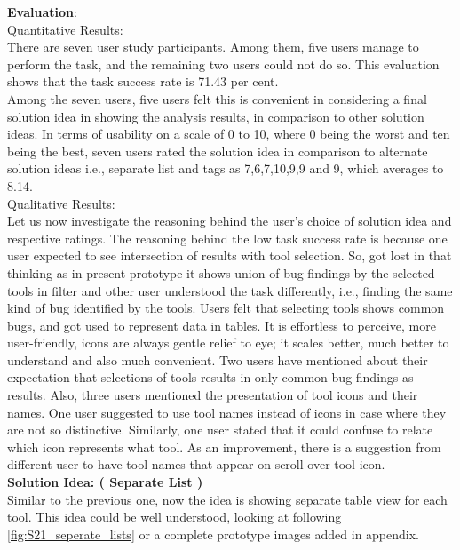 \textbf{Evaluation}: \\

Quantitative Results: \\

There are seven user study participants. Among them, five users manage to perform the task, and the remaining two users could not do so. This evaluation shows that the task success rate is 71.43 per cent. \\

Among the seven users, five users felt this is convenient in considering a final solution idea in showing the analysis results, in comparison to other solution ideas. In terms of usability on a scale of 0 to 10, where 0 being the worst and ten being the best, seven users rated the solution idea in comparison to alternate solution ideas i.e., separate list and tags as 7,6,7,10,9,9 and 9, which averages to 8.14. \\

Qualitative Results: \\

Let us now investigate the reasoning behind the user’s choice of solution idea and respective ratings. The reasoning behind the low task success rate is because one user expected to see intersection of results with tool selection. So, got lost in that thinking as in present prototype it shows union of bug findings by the selected tools in filter and other user understood the task differently, i.e., finding the same kind of bug identified by the tools.  Users felt that selecting tools shows common bugs, and got used to represent data in tables. It is effortless to perceive, more user-friendly, icons are always gentle relief to eye; it scales better, much better to understand and also much convenient. Two users have mentioned about their expectation that selections of tools results in only common bug-findings as results. Also, three users mentioned the presentation of tool icons and their names. One user suggested to use tool names instead of icons in case where they are not so distinctive. Similarly, one user stated that it could confuse to relate which icon represents what tool. As an improvement, there is a suggestion from different user to have tool names that appear on scroll over tool icon. \\

\textbf{Solution Idea: ( Separate List )} \\

Similar to the previous one, now the idea is showing separate table view for each tool. This idea could be well understood, looking at following \autoref{fig:S21_seperate_lists} or a complete prototype images added in appendix.  \\


